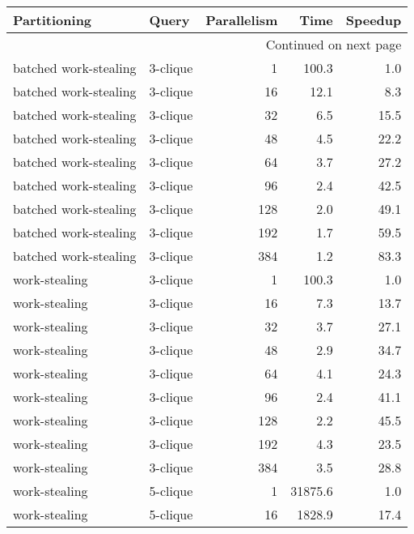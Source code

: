 \begin{longtable}{llr|rr}
\toprule
          Partitioning &     Query &  Parallelism &     Time &  Speedup \\
\midrule
\endhead
\midrule
\multicolumn{5}{r}{{Continued on next page}} \\
\midrule
\endfoot

\bottomrule
\endlastfoot
 batched work-stealing &  3-clique &            1 &    100.3 &      1.0 \\
 batched work-stealing &  3-clique &           16 &     12.1 &      8.3 \\
 batched work-stealing &  3-clique &           32 &      6.5 &     15.5 \\
 batched work-stealing &  3-clique &           48 &      4.5 &     22.2 \\
 batched work-stealing &  3-clique &           64 &      3.7 &     27.2 \\
 batched work-stealing &  3-clique &           96 &      2.4 &     42.5 \\
 batched work-stealing &  3-clique &          128 &      2.0 &     49.1 \\
 batched work-stealing &  3-clique &          192 &      1.7 &     59.5 \\
 batched work-stealing &  3-clique &          384 &      1.2 &     83.3 \\
         work-stealing &  3-clique &            1 &    100.3 &      1.0 \\
         work-stealing &  3-clique &           16 &      7.3 &     13.7 \\
         work-stealing &  3-clique &           32 &      3.7 &     27.1 \\
         work-stealing &  3-clique &           48 &      2.9 &     34.7 \\
         work-stealing &  3-clique &           64 &      4.1 &     24.3 \\
         work-stealing &  3-clique &           96 &      2.4 &     41.1 \\
         work-stealing &  3-clique &          128 &      2.2 &     45.5 \\
         work-stealing &  3-clique &          192 &      4.3 &     23.5 \\
         work-stealing &  3-clique &          384 &      3.5 &     28.8 \\
         work-stealing &  5-clique &            1 &  31875.6 &      1.0 \\
         work-stealing &  5-clique &           16 &   1828.9 &     17.4 \\

\end{longtable}
